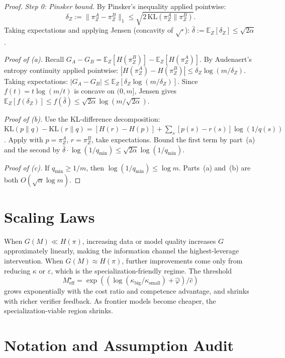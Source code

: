 \documentclass[10pt]{article}
\theoremstyle{paperplain}
\theoremstyle{paperdefinition}
\theoremstyle{paperremark}
\newcommand{\KL}{\mathrm{KL}}
\newcommand{\E}{\mathbb{E}}
\newcommand{\Meff}{M_{\mathrm{eff}}}
\begin{document}
\begin{proof}
\emph{Step 0: Pinsker bound.}
By Pinsker's inequality applied pointwise:
\[
\delta_Z := \|\pi^A_Z - \pi^B_Z\|_1 \le \sqrt{2\,\KL(\pi^A_Z \| \pi^B_Z)}.
\]
Taking expectations and applying Jensen (concavity of $\sqrt{\cdot}$):
$\bar\delta := \E_Z[\delta_Z] \le \sqrt{2\alpha}$.

\emph{Proof of (a).}
Recall $G_A - G_B = \E_Z[H(\pi^B_Z)] - \E_Z[H(\pi^A_Z)]$.
By Audenaert's entropy continuity applied pointwise:
$|H(\pi^A_Z) - H(\pi^B_Z)| \le \delta_Z \log(m/\delta_Z)$.
Taking expectations:
$|G_A - G_B| \le \E_Z[\delta_Z \log(m/\delta_Z)]$.
Since $f(t) = t\log(m/t)$ is concave on $(0, m]$,
Jensen gives $\E_Z[f(\delta_Z)] \le f(\bar\delta) \le \sqrt{2\alpha}\log(m/\sqrt{2\alpha})$.

\emph{Proof of (b).}
Use the KL-difference decomposition:
$\KL(p\|q) - \KL(r\|q) = [H(r) - H(p)] + \sum_s [p(s) - r(s)]\log(1/q(s))$.
Apply with $p = \pi^A_Z$, $r = \pi^B_Z$, take expectations.
Bound the first term by part~(a) and the second by $\bar\delta \cdot \log(1/q_{\min}) \le \sqrt{2\alpha}\log(1/q_{\min})$.

\emph{Proof of (c).}
If $q_{\min} \ge 1/m$, then $\log(1/q_{\min}) \le \log m$.
Parts~(a) and~(b) are both $O(\sqrt{\alpha}\log m)$.
\end{proof}

\section{Scaling Laws}
\label{app:scaling}

When $G(M)\ll H(\pi)$, increasing data or model quality increases $G$ approximately linearly, making the information channel the highest-leverage intervention. When $G(M)\approx H(\pi)$, further improvements come only from reducing $\kappa$ or $\varepsilon$, which is the specialization-friendly regime. The threshold
\[
\Meff^\star=\exp((\log(\kappa_{\mathrm{big}}/\kappa_{\mathrm{small}})+\hat\varphi)/\hat c)
\]
grows exponentially with the cost ratio and competence advantage, and shrinks with richer verifier feedback. As frontier models become cheaper, the specialization-viable region shrinks.

\section{Notation and Assumption Audit}
\label{app:notation}
\end{document}
